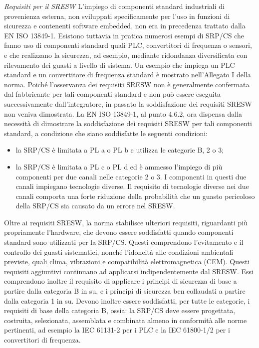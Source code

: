 \textit{Requisiti per il SRESW}
L'impiego di componenti standard industriali di provenienza esterna, non sviluppati specificamente per l'uso in funzioni di sicurezza e contenenti software embedded, non era in precedenza trattato dalla EN ISO 13849-1. Esistono tuttavia in pratica numerosi esempi di SRP/CS che fanno uso di componenti standard quali PLC, convertitori di frequenza o sensori, e che realizzano la sicurezza, ad esempio, mediante ridondanza diversificata con rilevamento dei guasti a livello di sistema. Un esempio che impiega un PLC standard e un convertitore di frequenza standard è mostrato nell'Allegato I della norma. Poiché l'osservanza dei requisiti SRESW non è generalmente confermata dal fabbricante per tali componenti standard e non può essere eseguita successivamente dall'integratore, in passato la soddisfazione dei requisiti SRESW non veniva dimostrata.
La EN ISO 13849-1, al punto 4.6.2, ora dispensa dalla necessità di dimostrare la soddisfazione dei requisiti SRESW per tali componenti standard, a condizione che siano soddisfatte le seguenti condizioni:
\begin{itemize}
    \item la SRP/CS è limitata a PL a o PL b e utilizza le categorie B, 2 o 3;
    \item la SRP/CS è limitata a PL c o PL d ed è ammesso l'impiego di più componenti per due canali nelle categorie 2 o 3. I componenti in questi due canali impiegano tecnologie diverse. Il requisito di tecnologie diverse nei due canali comporta una forte riduzione della probabilità che un guasto pericoloso della SRP/CS sia causato da un errore nel SRESW.
\end{itemize}

Oltre ai requisiti SRESW, la norma stabilisce ulteriori requisiti, riguardanti più propriamente l'hardware, che devono essere soddisfatti quando componenti standard sono utilizzati per la SRP/CS. Questi comprendono l'evitamento e il controllo dei guasti sistematici, nonché l'idoneità alle condizioni ambientali previste, quali clima, vibrazioni e compatibilità elettromagnetica (CEM). Questi requisiti aggiuntivi continuano ad applicarsi indipendentemente dal SRESW. Essi comprendono inoltre il requisito di applicare i principi di sicurezza di base a partire dalla categoria B in su, e i principi di sicurezza ben collaudati a partire dalla categoria 1 in su. Devono inoltre essere soddisfatti, per tutte le categorie, i requisiti di base della categoria B, ossia: la SRP/CS deve essere progettata, costruita, selezionata, assemblata e combinata almeno in conformità alle norme pertinenti, ad esempio la IEC 61131-2 per i PLC e la IEC 61800-1/2 per i convertitori di frequenza.

